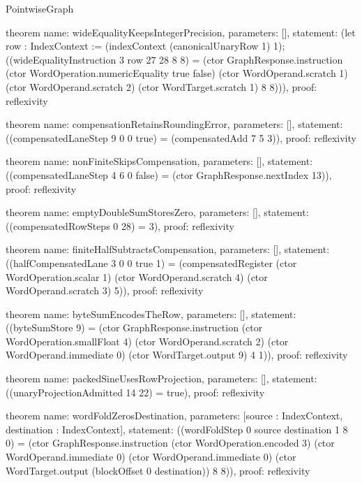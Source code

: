 \begin{lexlean}{PointwiseGraph}
\begin{semanticmodule}
theorem{
  name: wideEqualityKeepsIntegerPrecision,
  parameters: [],
  statement: (let row : IndexContext := (indexContext (canonicalUnaryRow 1) 1); ((wideEqualityInstruction 3 row 27 28 8 8) = (ctor GraphResponse.instruction (ctor WordOperation.numericEquality true false) (ctor WordOperand.scratch 1) (ctor WordOperand.scratch 2) (ctor WordTarget.scratch 1) 8 8))),
  proof: reflexivity{}
}

theorem{
  name: compensationRetainsRoundingError,
  parameters: [],
  statement: ((compensatedLaneStep 9 0 0 true) = (compensatedAdd 7 5 3)),
  proof: reflexivity{}
}

theorem{
  name: nonFiniteSkipsCompensation,
  parameters: [],
  statement: ((compensatedLaneStep 4 6 0 false) = (ctor GraphResponse.nextIndex 13)),
  proof: reflexivity{}
}

theorem{
  name: emptyDoubleSumStoresZero,
  parameters: [],
  statement: ((compensatedRowSteps 0 28) = 3),
  proof: reflexivity{}
}

theorem{
  name: finiteHalfSubtractsCompensation,
  parameters: [],
  statement: ((halfCompensatedLane 3 0 0 true 1) = (compensatedRegister (ctor WordOperation.scalar 1) (ctor WordOperand.scratch 4) (ctor WordOperand.scratch 3) 5)),
  proof: reflexivity{}
}

theorem{
  name: byteSumEncodesTheRow,
  parameters: [],
  statement: ((byteSumStore 9) = (ctor GraphResponse.instruction (ctor WordOperation.smallFloat 4) (ctor WordOperand.scratch 2) (ctor WordOperand.immediate 0) (ctor WordTarget.output 9) 4 1)),
  proof: reflexivity{}
}

theorem{
  name: packedSineUsesRowProjection,
  parameters: [],
  statement: ((unaryProjectionAdmitted 14 22) = true),
  proof: reflexivity{}
}

theorem{
  name: wordFoldZerosDestination,
  parameters: [source : IndexContext, destination : IndexContext],
  statement: ((wordFoldStep 0 source destination 1 8 0) = (ctor GraphResponse.instruction (ctor WordOperation.encoded 3) (ctor WordOperand.immediate 0) (ctor WordOperand.immediate 0) (ctor WordTarget.output (blockOffset 0 destination)) 8 8)),
  proof: reflexivity{}
}

\end{semanticmodule}
\end{lexlean}
